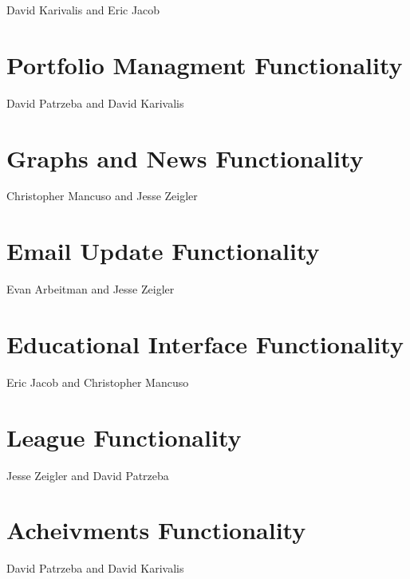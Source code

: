\documentclass[11pt,letterpaper,oneside]{memoir}
\begin{document}
David Karivalis and Eric Jacob

\section{Portfolio Managment Functionality}

David Patrzeba and David Karivalis

\section{Graphs and News Functionality}

Christopher Mancuso and Jesse Zeigler

\section{Email Update Functionality}

Evan Arbeitman and Jesse Zeigler

\section{Educational Interface Functionality}

Eric Jacob and Christopher Mancuso

\section{League Functionality}

Jesse Zeigler and David Patrzeba

\section{Acheivments Functionality}

David Patrzeba and David Karivalis
\end{document}
